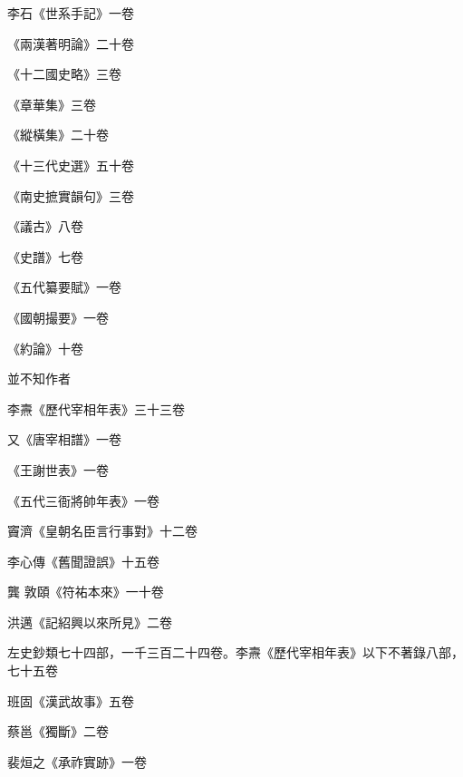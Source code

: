 \begin{pinyinscope}
 李石《世系手記》一卷



 《兩漢著明論》二十卷



 《十二國史略》三卷



 《章華集》三卷



 《縱橫集》二十卷



 《十三代史選》五十卷



 《南史摭實韻句》三卷



 《議古》八卷



 《史譜》七卷



 《五代纂要賦》一卷



 《國朝撮要》一卷



 《約論》十卷



 並不知作者



 李燾《歷代宰相年表》三十三卷



 又《唐宰相譜》一卷



 《王謝世表》一卷



 《五代三衙將帥年表》一卷



 竇濟《皇朝名臣言行事對》十二卷



 李心傳《舊聞證誤》十五卷



 龔
 敦頤《符祐本來》一十卷



 洪邁《記紹興以來所見》二卷



 左史鈔類七十四部，一千三百二十四卷。李燾《歷代宰相年表》以下不著錄八部，七十五卷



 班固《漢武故事》五卷



 蔡邕《獨斷》二卷



 裴烜之《承祚實跡》一卷




\end{pinyinscope}

